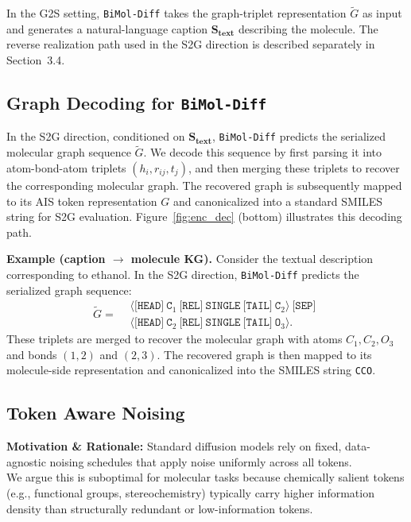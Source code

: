 \noindent In the G2S setting,
\texttt{BiMol-Diff} takes the graph-triplet representation $\tilde{G}$ as input
and generates a natural-language caption $\mathbf{S_{text}}$ describing the
molecule. The reverse realization path used in the S2G direction is
described separately in Section~3.4.


\subsection{Graph Decoding for \texttt{BiMol-Diff}}
In the S2G direction, conditioned on \(\mathbf{S_{text}}\), \texttt{BiMol-Diff}
predicts the serialized molecular graph sequence \(\tilde{G}\). We decode
this sequence by first parsing it into atom-bond-atom triplets
\((h_i, r_{ij}, t_j)\), and then merging these triplets to recover the
corresponding molecular graph. The recovered graph is subsequently mapped
to its AIS token representation \(G\) and canonicalized into a standard
SMILES string for S2G evaluation. Figure~\ref{fig:enc_dec} (bottom)
illustrates this decoding path.


\noindent \textbf{Example (caption $\rightarrow$ molecule KG).}
Consider the textual description corresponding to ethanol. In the S2G
direction, \texttt{BiMol-Diff} predicts the serialized graph sequence:
\begin{equation}
    \tilde{G}
=
\begin{aligned}
&\langle \texttt{[HEAD]}~\texttt{C}_1~\texttt{[REL]}~\texttt{SINGLE}~\texttt{[TAIL]}~\texttt{C}_2 \rangle~\texttt{[SEP]}\\
&\langle \texttt{[HEAD]}~\texttt{C}_2~\texttt{[REL]}~\texttt{SINGLE}~\texttt{[TAIL]}~\texttt{O}_3 \rangle .
\end{aligned}
\end{equation}
These triplets are merged to recover the molecular graph with atoms
\(C_1,C_2,O_3\) and bonds \((1,2)\) and \((2,3)\). The recovered graph
is then mapped to its molecule-side representation and canonicalized into
the SMILES string \texttt{CCO}.

\subsection{Token Aware Noising}
\label{adaptive noise}
\noindent \textbf{Motivation \& Rationale:}\label{motivation}
Standard diffusion models rely on fixed, data-agnostic noising schedules that
apply noise uniformly across all tokens. \\
We argue this is suboptimal for molecular tasks because chemically salient tokens (e.g., functional groups, stereochemistry) typically carry higher information density than structurally redundant or low-information tokens.

